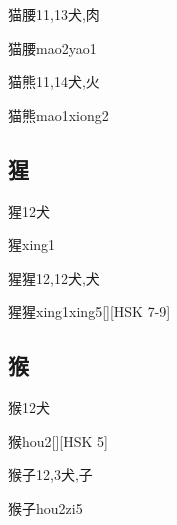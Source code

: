 \begin{Entry}{猫腰}{11,13}{⽝,⾁}
  \begin{Phonetics}{猫腰}{mao2yao1}
  \end{Phonetics}
\end{Entry}

\begin{Entry}{猫熊}{11,14}{⽝,⽕}
  \begin{Phonetics}{猫熊}{mao1xiong2}
  \end{Phonetics}
\end{Entry}

\subsection*{猩}

\begin{Entry}{猩}{12}{⽝}
  \begin{Phonetics}{猩}{xing1}
  \end{Phonetics}
\end{Entry}

\begin{Entry}{猩猩}{12,12}{⽝,⽝}
  \begin{Phonetics}{猩猩}{xing1xing5}[][HSK 7-9]
  \end{Phonetics}
\end{Entry}

\subsection*{猴}

\begin{Entry}{猴}{12}{⽝}
  \begin{Phonetics}{猴}{hou2}[][HSK 5]
  \end{Phonetics}
\end{Entry}

\begin{Entry}{猴子}{12,3}{⽝,⼦}
  \begin{Phonetics}{猴子}{hou2zi5}
  \end{Phonetics}
\end{Entry}

